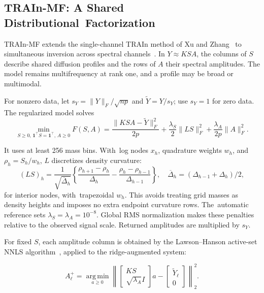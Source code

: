 \documentclass[mathematics,article,accept,moreauthors]{Definitions/mdpi}
\newcommand{\one}{\mathbf{1}}
\newcommand{\argmin}{\operatorname*{arg\,min}}
\begin{document}
\subsection{TRAIn-MF: A Shared Distributional~Factorization}\label{sec:mfmath}
TRAIn-MF extends the single-channel TRAIn method of Xu and Zhang~\cite{train} to simultaneous inversion across spectral channels~\cite{mfv31}. In $Y\approx KSA$, the columns of $S$ describe shared diffusion profiles and the rows of $A$ their spectral amplitudes. The model remains multifrequency at rank one, and a profile may be broad or multimodal.

For nonzero data, let $s_Y=\|Y\|_F/\sqrt{np}$ and $\widetilde Y=Y/s_Y$; use $s_Y=1$ for zero data. The regularized model solves
\begin{equation}\label{eq:mf}
 \min_{S\geq0,\,\one^\top S=\one^\top,\,A\geq0}
 F(S,A)=\frac{\|KSA-\widetilde Y\|_F^2}{2p}
 +\frac{\lambda_S}{2}\|LS\|_F^2+\frac{\lambda_A}{2p}\|A\|_F^2.
\end{equation}

It uses at least 256 mass bins. With~log nodes $x_h$, quadrature weights $w_h$, and\linebreak  $\rho_h=S_h/w_h$, $L$ discretizes density curvature:
\begin{equation}\label{eq:mfcurvature}
 (LS)_h=\frac{1}{\sqrt{\overline\Delta_h}}
 \left\{\frac{\rho_{h+1}-\rho_h}{\Delta_h}
       -\frac{\rho_h-\rho_{h-1}}{\Delta_{h-1}}\right\},
 \quad \overline\Delta_h=(\Delta_{h-1}+\Delta_h)/2,
\end{equation}
for interior nodes, with~trapezoidal $w_h$. This avoids treating grid masses as density heights and imposes no extra endpoint curvature rows. The~automatic reference sets \mbox{$\lambda_S=\lambda_A=10^{-8}$.} Global RMS normalization makes these penalties relative to the observed signal scale. Returned amplitudes are multiplied by $s_Y$.

For fixed $S$, each amplitude column is obtained by the Lawson--Hanson active-set NNLS algorithm~\cite{lawson}, applied to the ridge-augmented system:

\begin{equation}\label{eq:mfA}
 A_\ell^+=\argmin_{a\geq0}
 \left\|\begin{bmatrix}KS\\\sqrt{\lambda_A}I\end{bmatrix}a
       -\begin{bmatrix}\widetilde Y_\ell\\0\end{bmatrix}\right\|_2^2.
\end{equation}
\end{document}
